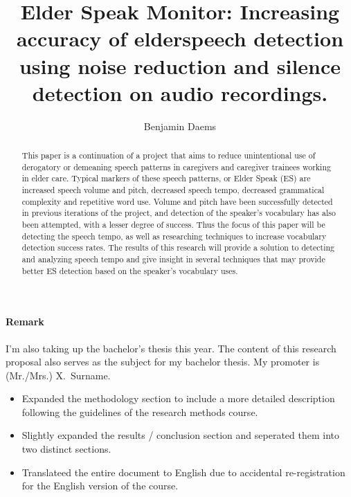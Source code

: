 \documentclass[english]{hogent-article}
\title{Elder Speak Monitor: Increasing accuracy of elderspeech detection using noise reduction and silence detection on audio recordings.}
\author{Benjamin Daems}
\begin{document}
\begin{abstract}
This paper is a continuation of a project that aims to reduce unintentional use of derogatory or demeaning speech patterns in caregivers and caregiver trainees working in elder care.
Typical markers of these speech patterns, or Elder Speak (ES) are increased speech volume and pitch, decreased speech tempo, decreased grammatical complexity and repetitive word use.
Volume and pitch have been successfully detected in previous iterations of the project, and detection of the speaker's vocabulary has also been attempted, with a lesser degree of success.
Thus the focus of this paper will be detecting the speech tempo, as well as researching techniques to increase vocabulary detection success rates.
The results of this research will provide a solution to detecting and analyzing speech tempo and give insight in several techniques that may provide better ES detection based on the speaker's vocabulary uses. 
\end{abstract}

\tableofcontents

\bigskip


\paragraph{Remark}

I'm also taking up the bachelor's thesis this year. The content of this research proposal also serves as the subject for my bachelor thesis. My promoter is (Mr./Mrs.) X.\ Surname.



\begin{itemize}
    \item Expanded the methodology section to include a more detailed description following the guidelines of the research methods course.
    \item Slightly expanded the results / conclusion section and seperated them into two distinct sections.
    \item Translateed the entire document to English due to accidental re-registration for the English version of the course.
\end{itemize}
\end{document}
